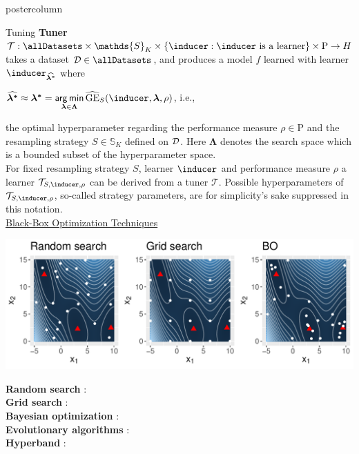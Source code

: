 \documentclass{beamer}
\begin{document}
\begin{frame}[fragile]{}
\begin{columns}
\begin{column}{.31\textwidth}
\begin{beamercolorbox}[center]{postercolumn}
\begin{minipage}{.98\textwidth}
{\begin{myblock}{Tuning}
\textbf{Tuner} $\mathcal{T}: \allDatasets \times \mathds{S}_K \times \{\inducer: \inducer \textrm{ is a learner}\} \times \mathrm{P} \rightarrow \Hspace$ takes a dataset $\D \in \allDatasets$, and produces a model $f$ learned with learner $\inducer_{\boldsymbol{\widehat{\lambda^*}}}$ where
\begin{center}$\boldsymbol{\widehat{\lambda^*}} \approx \boldsymbol{\lambda^*} = \argmin \limits_{\boldsymbol{\lambda} \in \bm{\Lambda}} \widehat{\mathrm{GE}}_S(\inducer, \boldsymbol\lambda, \rho)$, i.e.,\end{center} the optimal hyperparameter regarding the performance measure $\rho \in \mathrm{P}$ and the resampling strategy $S \in \mathds{S}_K$ defined on $\mathcal{D}$. Here $\bm{\Lambda}$ denotes the search space which is a bounded subset of the hyperparameter space.\\

For fixed resampling strategy $S$, learner $\inducer$ and performance measure $\rho$ a learner $\mathcal{T}_{S,\inducer,\rho}$ can be derived from a tuner $\mathcal{T}.$ Possible hyperparameters of $\mathcal{T}_{S,\inducer,\rho}$, so-called strategy parameters, are for simplicity's sake suppressed in this notation.\\

\underline{Black-Box Optimization Techniques}\\

 \begin{center}
             \includegraphics[width=0.95\columnwidth]{figure/bb_cmp.pdf}
               \end{center}
\textbf{Random search} : \\

\textbf{Grid search} : \\ 

\textbf{Bayesian optimization} : \\

\textbf{Evolutionary algorithms} : \\

\textbf{Hyperband} : \\


\end{myblock}}
\end{minipage}
\end{beamercolorbox}
\end{column}
\end{columns}
\end{frame}
\end{document}
